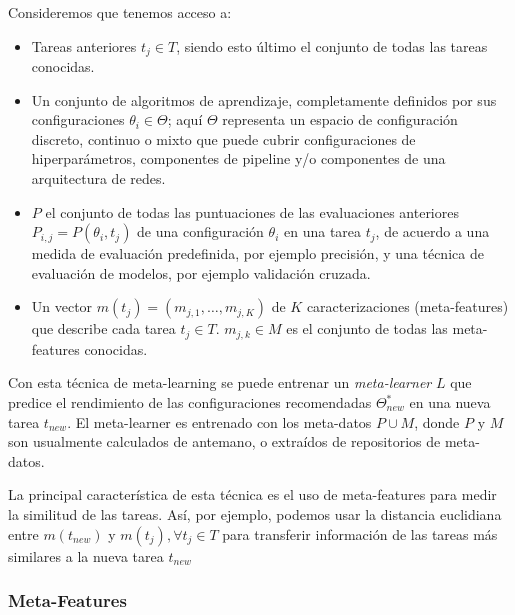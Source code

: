\begin{definition}
Consideremos que tenemos acceso a:

\begin{itemize}
	\item Tareas anteriores $t_j \in T$, siendo esto último el conjunto de todas las tareas conocidas.
	\item Un conjunto de algoritmos de aprendizaje, completamente definidos por sus configuraciones $\theta_i \in \Theta$; aquí $\Theta$ representa un espacio de configuración discreto, continuo o mixto que puede cubrir configuraciones de hiperparámetros, componentes de pipeline y/o componentes de una arquitectura de redes.
	\item $P$ el conjunto de todas las puntuaciones de las evaluaciones anteriores $P_{i,j} = P(\theta_i, t_j)$ de una configuración $\theta_i$ en una tarea $t_j$, de acuerdo a una medida de evaluación predefinida, por ejemplo precisión, y una técnica de evaluación de modelos, por ejemplo validación cruzada. 
	\item Un vector $m(t_j) = (m_{j,1}, …, m_{j,K})$ de $K$ caracterizaciones (meta-features) que describe cada tarea $t_j \in T$. $m_{j,k} \in M$ es el conjunto de todas las meta-features conocidas.
\end{itemize}

Con esta técnica de meta-learning se puede entrenar un \emph{meta-learner} $L$ que predice el rendimiento de las configuraciones recomendadas $\Theta^*_{new}$ en una nueva tarea $t_{new}$. El meta-learner es entrenado con los meta-datos $P\cup M$, donde $P$ y $M$ son usualmente calculados de antemano, o extraídos de repositorios de meta-datos. 

\end{definition}

La principal característica de esta técnica es el uso de meta-features para medir la similitud de las tareas. Así, por ejemplo, podemos usar la distancia euclidiana entre $m(t_{new})$ y $m(t_j), \forall t_j \in T$ para transferir información de las tareas más similares a la nueva tarea $t_{new}$


\subsubsection{Meta-Features}

